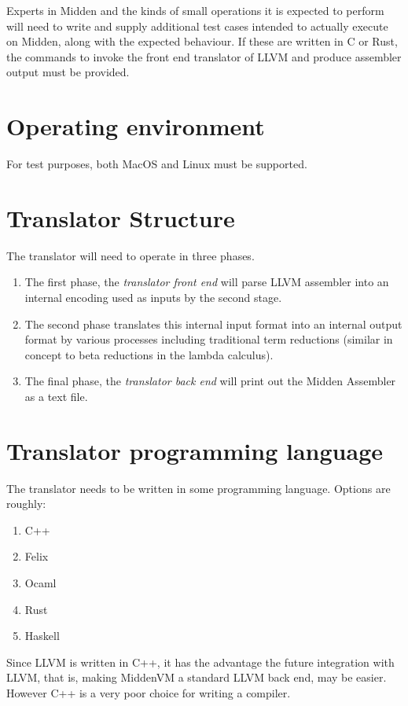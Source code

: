 \documentclass{article}
\begin{document}
Experts in Midden and the kinds of small operations it is expected
to perform will need to write and supply additional test cases
intended to actually execute on Midden, along with the expected behaviour.
If these are written in C or Rust, the commands to invoke the front end
translator of LLVM and produce assembler output must be provided.

\section{Operating environment}
For test purposes, both MacOS and Linux must be supported.

\section{Translator Structure}
The translator will need to operate in three phases.
\begin{enumerate}
\item The first phase, the {\em translator front end} will parse 
LLVM assembler into an internal encoding
used as inputs by the second stage.
\item The second phase translates this internal input format
into an internal output format by various processes including
traditional term reductions (similar in concept to beta reductions
in the lambda calculus).
\item The final phase, the {\em translator back end} will print out
the Midden Assembler as a text file.
\end{enumerate}

\section{Translator programming language}
The translator needs to be written in some programming language.
Options are roughly:
\begin{enumerate}
\item C++
\item Felix
\item Ocaml
\item Rust
\item Haskell
\end{enumerate}

Since LLVM is written in C++, it has the advantage the future integration
with LLVM, that is, making MiddenVM a standard LLVM back end, may
be easier. However C++ is a very poor choice for writing a compiler.
\end{document}

